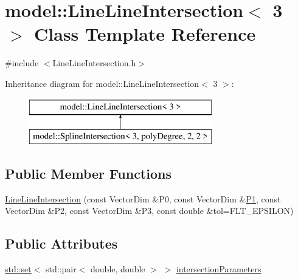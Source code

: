 \hypertarget{classmodel_1_1_line_line_intersection_3_013_01_4}{}\section{model\+:\+:Line\+Line\+Intersection$<$ 3 $>$ Class Template Reference}
\label{classmodel_1_1_line_line_intersection_3_013_01_4}


{\ttfamily \#include $<$Line\+Line\+Intersection.\+h$>$}

Inheritance diagram for model\+:\+:Line\+Line\+Intersection$<$ 3 $>$\+:\begin{figure}[H]
\begin{center}
\leavevmode
\includegraphics[height=2.000000cm]{classmodel_1_1_line_line_intersection_3_013_01_4}
\end{center}
\end{figure}
\subsection*{Public Member Functions}
\begin{DoxyCompactItemize}
\item 
\hyperlink{classmodel_1_1_line_line_intersection_3_013_01_4_ac26cac631dd7f03deef90c2247dc26c7}{Line\+Line\+Intersection} (const Vector\+Dim \&P0, const Vector\+Dim \&\hyperlink{run_multipole_8m_af93dd7f73e57b8b17d34efa33f0f948e}{P1}, const Vector\+Dim \&P2, const Vector\+Dim \&P3, const double \&tol=F\+L\+T\+\_\+\+E\+P\+S\+I\+L\+O\+N)
\end{DoxyCompactItemize}
\subsection*{Public Attributes}
\begin{DoxyCompactItemize}
\item 
\hyperlink{plot_cells_8m_a03623d69001c34fc77654be29bdc3d8a}{std\+::set}$<$ std\+::pair$<$ double, double $>$ $>$ \hyperlink{classmodel_1_1_line_line_intersection_3_013_01_4_a0e74f0fbbd81ec67488d8f67723d1c0f}{intersection\+Parameters}
\end{DoxyCompactItemize}


